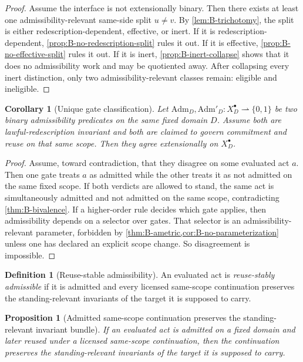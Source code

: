 \documentclass[11pt]{article}
\theoremstyle{plain}
\newtheorem{proposition}[theorem]{Proposition}
\newtheorem{corollary}[theorem]{Corollary}
\theoremstyle{definition}
\newtheorem{definition}[theorem]{Definition}
\newcommand{\Adm}{\mathrm{Adm}}
\newcommand{\Eval}{X_D^{\bullet}}
\newcommand{\domain}{D}
\begin{document}
\begin{proof}
Assume the interface is not extensionally binary. Then there exists at least one admissibility-relevant same-side split $u\neq v$. By \cref{lem:B-trichotomy}, the split is either redescription-dependent, effective, or inert. If it is redescription-dependent, \cref{prop:B-no-redescription-split} rules it out. If it is effective, \cref{prop:B-no-effective-split} rules it out. If it is inert, \cref{prop:B-inert-collapse} shows that it does no admissibility work and may be quotiented away. After collapsing every inert distinction, only two admissibility-relevant classes remain: eligible and ineligible.
\end{proof}

\begin{corollary}[Unique gate classification]
\label{cor:B-unique-gate}
Let $\Adm_\domain,\Adm'_\domain:\Eval\rightharpoonup \{0,1\}$ be two binary admissibility predicates on the same fixed domain $\domain$. Assume both are lawful-redescription invariant and both are claimed to govern commitment and reuse on that same scope. Then they agree extensionally on $\Eval$.
\end{corollary}

\begin{proof}
Assume, toward contradiction, that they disagree on some evaluated act $a$. Then one gate treats $a$ as admitted while the other treats it as not admitted on the same fixed scope. If both verdicts are allowed to stand, the same act is simultaneously admitted and not admitted on the same scope, contradicting \cref{thm:B-bivalence}. If a higher-order rule decides which gate applies, then admissibility depends on a selector over gates. That selector is an admissibility-relevant parameter, forbidden by \cref{thm:B-ametric,cor:B-no-parameterization} unless one has declared an explicit scope change. So disagreement is impossible.
\end{proof}

\begin{definition}[Reuse-stable admissibility]
An evaluated act is \emph{reuse-stably admissible} if it is admitted and every licensed same-scope continuation preserves the standing-relevant invariants of the target it is supposed to carry.
\end{definition}

\begin{proposition}[Admitted same-scope continuation preserves the standing-relevant invariant bundle]
\label{prop:B-preserve-invariants}
If an evaluated act is admitted on a fixed domain and later reused under a licensed same-scope continuation, then the continuation preserves the standing-relevant invariants of the target it is supposed to carry.
\end{proposition}
\end{document}

